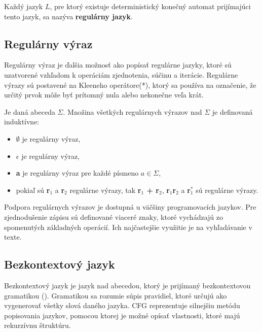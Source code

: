 Každý jazyk $L$, pre ktorý existuje deterministický konečný automat prijímajúci tento jazyk, sa nazýva \textbf{regulárny jazyk}.

\subsection{Regulárny výraz}\label{regexp}
Regulárny výraz je ďalšia možnosť ako popísať regulárne jazyky, ktoré sú uzatvorené vzhľadom k operáciám zjednotenia, súčinu a iterácie. Regulárne výrazy sú postavené na Kleeneho operátore(*), ktorý sa používa na označenie, že určitý prvok môže byť prítomný nula alebo nekonečne veľa krát.
\begin{definice}
Je daná abeceda $\Sigma$. Množina všetkých regulárnych výrazov nad $\Sigma$ je definovaná induktívne:
\begin{itemize}
\item $\emptyset$ je regulárny výraz,
\item $\epsilon$ je regulárny výraz,
\item \textbf{a} je regulárny výraz pre každé písmeno $a \in \Sigma$,
\item pokiaľ sú \textbf{r$_1$} a \textbf{r$_2$} regulárne výrazy, tak \textbf{r$_1$ + r$_2$}, \textbf{r$_1$r$_2$} a \textbf{r$_1^*$} sú regulárne výrazy. \cite{demlova:automaty}
\end{itemize}
\end{definice}

Podpora regulárnych výrazov je dostupná u väčšiny programovacích jazykov. Pre zjednodušenie zápisu sú definované viaceré znaky, ktoré vychádzajú zo spomenutých základných operácií. Ich najčastejšie využitie je na vyhľadávanie v texte.


\subsection{Bezkontextový jazyk}\label{CFG}
Bezkontextový jazyk je jazyk nad abecedou, ktorý je prijímaný bezkontextovou gramatikou (). Gramatikou sa rozumie súpis pravidiel, ktoré určujú ako vygenerovať všetky slová daného jazyka. CFG reprezentuje silnejšiu metódu popisovania jazykov, pomocou ktorej je možné opísať vlastnosti, ktoré majú rekurzívnu štruktúru.

